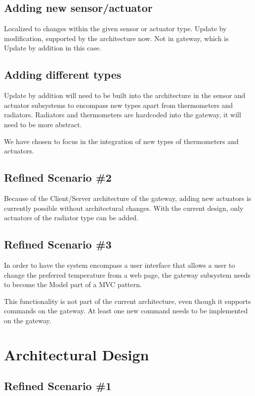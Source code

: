 \documentclass[a4paper,10pt]{article}
\begin{document}
\subsection{Adding new sensor/actuator}
Localized to changes within the given sensor or actuator type. Update by modification, supported by the architecture now. Not in gateway, which is Update by addition in this case. 

\subsection{Adding different types}
Update by addition will need to be built into the architecture in the sensor and actuator subsystems to encompass new types apart from thermometers and radiators. Radiators and thermometers are hardcoded into the gateway, it will need to be more abstract.

We have chosen to focus in the integration of new types of thermometers and actuators.


\subsection{Refined Scenario \#2}
Because of the Client/Server architecture of the gateway, adding new actuators is currently possible without architectural changes. With the current design, only actuators of the radiator type can be added.

\subsection{Refined Scenario \#3}
In order to have the system encompass a user interface that allows a user to change the preferred temperature from a web page, the gateway subsystem needs to become the Model part of a MVC pattern.

This functionality is not part of the current architecture, even though it supports commands on the gateway. At least one new command needs to be implemented on the gateway.

\section{Architectural Design}

\subsection{Refined Scenario \#1}
\end{document}
